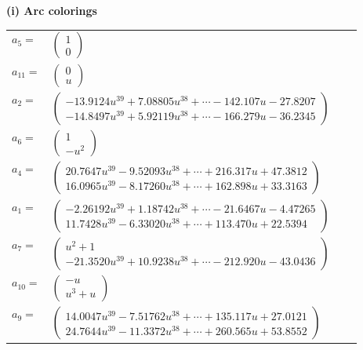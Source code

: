 \documentclass[1p]{elsarticle_modified}
\theoremstyle{definition}
\begin{document}
\flushleft \textbf{(i) Arc colorings}\\
\begin{tabular}{m{7pt} m{180pt} m{7pt} m{180pt} }
\flushright $a_{5}=$&$\begin{pmatrix}1\\0\end{pmatrix}$ \\
\flushright $a_{11}=$&$\begin{pmatrix}0\\u\end{pmatrix}$ \\
\flushright $a_{2}=$&$\begin{pmatrix}-13.9124 u^{39}+7.08805 u^{38}+\cdots-142.107 u-27.8207\\-14.8497 u^{39}+5.92119 u^{38}+\cdots-166.279 u-36.2345\end{pmatrix}$ \\
\flushright $a_{6}=$&$\begin{pmatrix}1\\- u^2\end{pmatrix}$ \\
\flushright $a_{4}=$&$\begin{pmatrix}20.7647 u^{39}-9.52093 u^{38}+\cdots+216.317 u+47.3812\\16.0965 u^{39}-8.17260 u^{38}+\cdots+162.898 u+33.3163\end{pmatrix}$ \\
\flushright $a_{1}=$&$\begin{pmatrix}-2.26192 u^{39}+1.18742 u^{38}+\cdots-21.6467 u-4.47265\\11.7428 u^{39}-6.33020 u^{38}+\cdots+113.470 u+22.5394\end{pmatrix}$ \\
\flushright $a_{7}=$&$\begin{pmatrix}u^2+1\\-21.3520 u^{39}+10.9238 u^{38}+\cdots-212.920 u-43.0436\end{pmatrix}$ \\
\flushright $a_{10}=$&$\begin{pmatrix}- u\\u^3+u\end{pmatrix}$ \\
\flushright $a_{9}=$&$\begin{pmatrix}14.0047 u^{39}-7.51762 u^{38}+\cdots+135.117 u+27.0121\\24.7644 u^{39}-11.3372 u^{38}+\cdots+260.565 u+53.8552\end{pmatrix}$ \\

\end{tabular}
\end{document}
